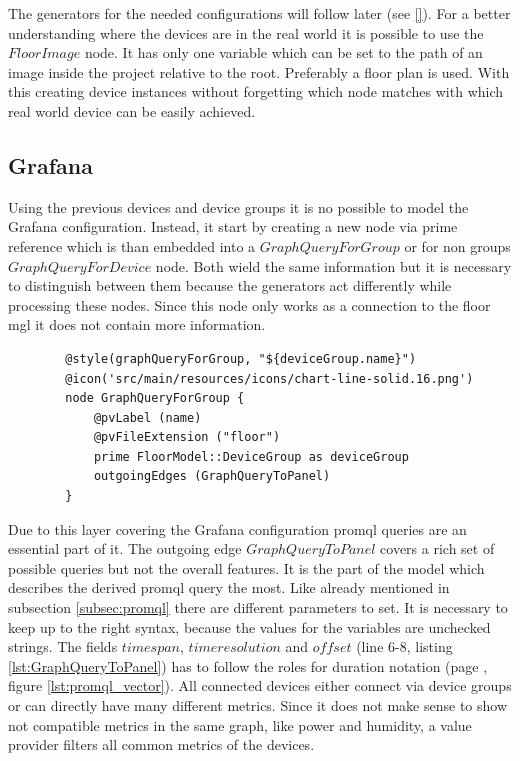 The generators for the needed configurations will follow later (see \autoref{}). For a better understanding where the devices are in the real world it is possible to use the $FloorImage$ node. It has only one variable which can be set to the path of an image inside the project relative to the root. Preferably a floor plan is used. With this creating device instances without forgetting which node matches with which real world device can be easily achieved.

\subsection{Grafana}

Using the previous devices and device groups it is no possible to model the Grafana configuration. Instead, it start by creating a new node via prime reference which is than embedded into a $GraphQueryForGroup$ or for non groups $GraphQueryForDevice$ node. Both wield the same information but it is necessary to distinguish between them because the generators act differently while processing these nodes. Since this node only works as a connection to the floor \gls{mgl} it does not contain more information. 

\begin{listing}[H]
	\begin{verbatim}
		@style(graphQueryForGroup, "${deviceGroup.name}")
		@icon('src/main/resources/icons/chart-line-solid.16.png')
		node GraphQueryForGroup {
			@pvLabel (name)
			@pvFileExtension ("floor")
			prime FloorModel::DeviceGroup as deviceGroup
			outgoingEdges (GraphQueryToPanel)
		}
	\end{verbatim}
\end{listing}

Due to this layer covering the Grafana configuration \gls{promql} queries are an essential part of it. The outgoing edge $GraphQueryToPanel$ covers a rich set of possible queries but not the overall features. It is the part of the model which describes the derived \gls{promql} query the most. Like already mentioned in subsection \ref{subsec:promql} there are different parameters to set. It is necessary to keep up to the right syntax, because the values for the variables are unchecked strings. The fields $timespan$, $timeresolution$ and $offset$ (line 6-8, listing \ref{lst:GraphQueryToPanel}) has to follow the roles for duration notation (page \pageref{lst:promql_vector}, figure \ref{lst:promql_vector}). All connected devices either connect via device groups or can directly have many different metrics. Since it does not make sense to show not compatible metrics in the same graph, like power and humidity, a value provider filters all common metrics of the devices. 


